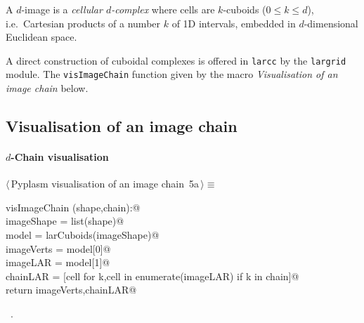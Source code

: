 \documentclass[11pt,oneside]{article}	%
\begin{document}
A $d$-image is a \emph{cellular $d$-complex} where cells are $k$-cuboids ($0\leq k\leq d$), i.e.~Cartesian products of a number $k$ of 1D intervals, embedded in $d$-dimensional Euclidean space. 

A direct construction of cuboidal complexes is offered in \texttt{larcc} by the \texttt{largrid} module. 
The \texttt{visImageChain} function given by the macro \emph{Visualisation of an image chain} below. 


\subsection{Visualisation of an image chain}

\paragraph{$d$-Chain visualisation}

\begin{flushleft} \small
\begin{minipage}{\linewidth} \label{scrap9}
\protect{}$\langle\,$Pyplasm visualisation of an image chain\nobreak\ {\footnotesize 5a}$\,\rangle\equiv$
\vspace{-1ex}
\begin{list}{}{} \item
\mbox{}\verb@def visImageChain (shape,chain):@\\
\mbox{}\verb@   imageShape = list(shape)@\\
\mbox{}\verb@   model = larCuboids(imageShape)@\\
\mbox{}\verb@   imageVerts = model[0]@\\
\mbox{}\verb@   imageLAR = model[1]@\\
\mbox{}\verb@   chainLAR = [cell for k,cell in enumerate(imageLAR) if k in chain]@\\
\mbox{}\verb@   return imageVerts,chainLAR@\\
\mbox{}\verb@@{\NWsep}
\end{list}
\vspace{-1ex}
\footnotesize\addtolength{\baselineskip}{-1ex}
\begin{list}{}{\setlength{\itemsep}{-\parsep}\setlength{\itemindent}{-\leftmargin}}
\item \NWtxtMacroRefIn\ .
\end{list}
\end{minipage}\\[4ex]
\end{flushleft}
\end{document}
